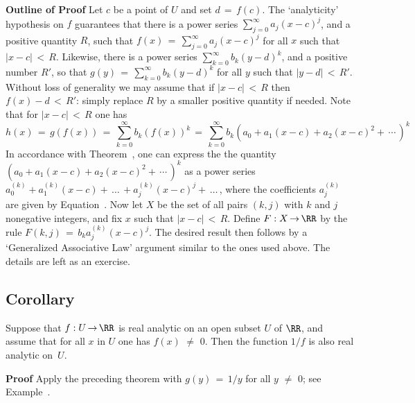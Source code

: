 \V

        {\bf Outline of Proof} Let $c$ be a point of $U$ and set $d \,=\, f(c)$. 
        The `analyticity' hypothesis on $f$ guarantees that there is a power series $\sum_{j=0}^{{\infty}} a_{j}(x-c)^{j}$, and a positive quantity $R$,
    such that $f(x) \,=\, \sum_{j=0}^{{\infty}} a_{j}(x-c)^{j}$ for all $x$ such that $|x-c|\,<\,R$.
    Likewise, there is a power series $\sum_{k=0}^{{\infty}} b_{k}(y-d)^{k}$, and a positive number $R'$,
    so that $g(y) \,=\, \sum_{k=0}^{{\infty}} b_{k}(y-d)^{k}$ for all $y$ such that $|y-d|\,<\,R'$.
    Without loss of generality we may assume that if $|x-c|\,<\,R$ then $f(x)-d\,<\,R'$: simply replace $R$ by a smaller positive quantity if needed.
    Note that for $|x-c|\,<\,R$ one has
        \begin{displaymath}
        h(x) \,=\, g(f(x)) \,=\, \sum_{k=0}^{{\infty}} b_{k}(f(x))^{k} \,=\, 
    \sum_{k=0}^{{\infty}} b_{k}\left(a_{0} + a_{1}(x-c) + a_{2}(x-c)^{2} +  \,{\cdots}\, \right)^{k}
        \end{displaymath}
    In accordance with Theorem~, one can express the the quantity $\left(a_{0} + a_{1}(x-c) + a_{2}(x-c)^{2} +  \,{\cdots}\, \right)^{k}$
    as a power series $a^{(k)}_{0} + a^{(k)}_{1}(x-c) + \,{\ldots}\, + a^{(k)}_{j}(x-c)^{j} +\,{\ldots}\,$, where the coefficients $a^{(k)}_{j}$ are given by Equation~.
    Now let $X$ be the set of all pairs $(k,j)$ with $k$ and $j$ nonegative integers, and fix $x$ such that $|x-c|\,<\,R$.
    Define $F:X \,{\rightarrow}\, {\RR}$ by the rule $F(k,j) \,=\, b_{k}a^{(k)}_{j}(x-c)^{j}$.
    The desired result then follows by a `Generalized Associative Law' argument similar to the ones used above.
    The details are left as an exercise.

\V

        \subsection{\small{{\bf Corollary}}}
        \label{CorG60.150}

\V

        Suppose that $f:U \,{\rightarrow}\, {\RR}$ is real analytic on  an open subset $U$ of ${\RR}$, and assume that for all $x$ in $U$ one has $f(x) \,\,{\neq}\,\, 0$.
    Then the function $1/f$ is also real analytic on~$U$.

\V

        {\bf Proof} Apply the preceding theorem with $g(y) \,=\, 1/y$ for all $y \,\,{\neq}\,\, 0$; see Example~.

\newpage


